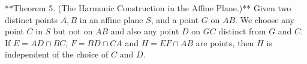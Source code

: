 **Theorem 5. (The Harmonic Construction in the Affine Plane.)** Given two distinct points $A, B$ in an affine plane $S$, and a point $G$ on $AB$. We choose any point $C$ in $S$ but not on $AB$ and also any point $D$ on $GC$ distinct from $G$ and $C$. If $E = AD \cap BC$, $F = BD \cap CA$ and $H = EF \cap AB$ are points, then $H$ is independent of the choice of $C$ and $D$.
